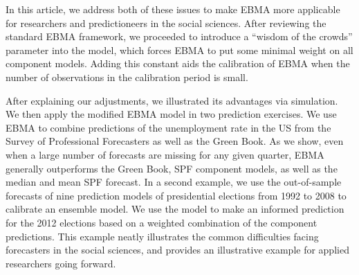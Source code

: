 \documentclass[12pt,fullpage,endnotes]{article}
\begin{document}
In this article, we address both of these issues to make EBMA more
applicable for researchers and predictioneers in the social
sciences. After reviewing the standard EBMA framework, we proceeded to
introduce a ``wisdom of the crowds'' parameter into the model, which
forces EBMA to put some minimal weight on all component models. Adding
this constant aids the calibration of EBMA when the number of
observations in the calibration period is small.

After explaining our adjustments, we illustrated its advantages via
simulation.  We then apply the modified EBMA model in two prediction
exercises. We use EBMA to combine predictions of the unemployment rate
in the US from the Survey of Professional Forecasters as well as the
Green Book. As we show, even when a large number of forecasts are
missing for any given quarter, EBMA generally outperforms the Green
Book, SPF component models, as well as the median and mean SPF
forecast.  In a second example, we use the out-of-sample forecasts of nine
prediction models of presidential elections from 1992 to 2008 to
calibrate an ensemble model. We use the model to make an informed
prediction for the 2012 elections based on a weighted combination of
the component predictions. This example neatly illustrates the common
difficulties facing forecasters in the social sciences, and provides an
illustrative example for applied researchers going forward.
\end{document}
